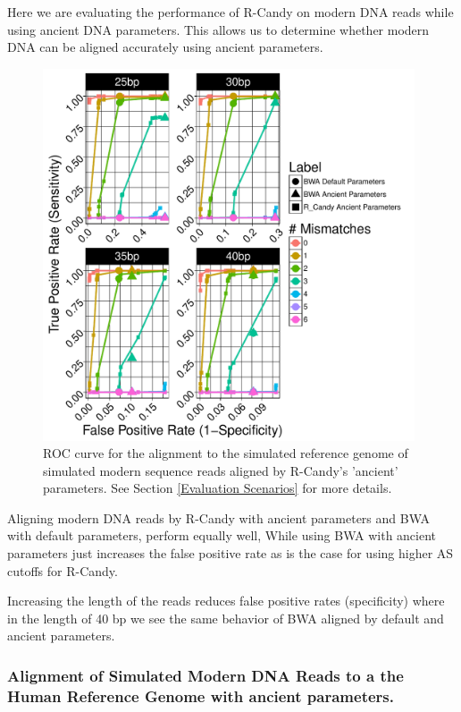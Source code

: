 \documentclass[11pt,a4paper]{report}
\begin{document}
Here we are evaluating the performance of R-Candy on modern DNA reads while 
using ancient DNA parameters. This allows us to determine whether modern DNA
can be aligned accurately using ancient parameters. 


\begin{figure}[H]
\centering
\includegraphics[width=11cm]{pictures/f_DS8_emp.pdf}
\caption{ ROC curve for the alignment to the simulated reference genome of 
simulated modern sequence reads aligned by R-Candy's 'ancient' parameters. See Section 
\ref{Evaluation Scenarios} for more details.}
\label{DS8_emp}
\end{figure}


Aligning modern DNA reads by R-Candy with ancient parameters and BWA with default 
parameters, perform equally well, While using BWA with ancient parameters just 
increases the false positive rate as is the case for using higher AS cutoffs for 
R-Candy.

Increasing the length of the reads reduces false positive rates (specificity)  
where in the length of 40 bp we see the same behavior of BWA aligned by default
and ancient parameters.




\subsubsection{ Alignment of Simulated Modern DNA Reads to a the Human Reference Genome
with ancient parameters.}
\end{document}

